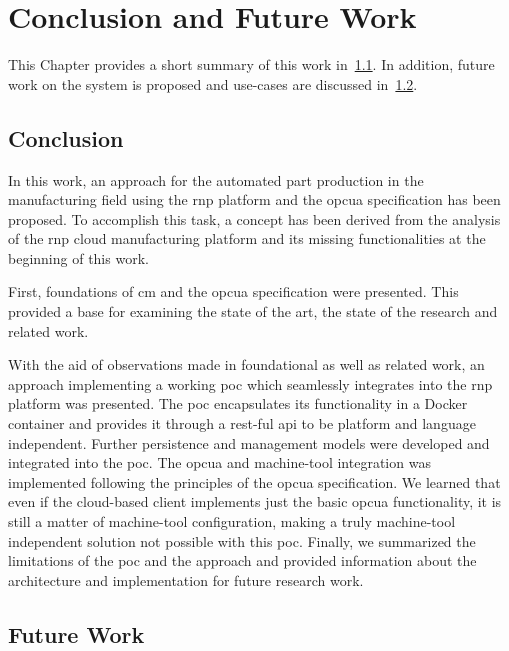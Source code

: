 \documentclass[
a4paper,
twoside,
headsepline,
cleardoublepage=empty,
parskip=half,
draft=false
]{scrbook}
\begin{document}
	\chapter{Conclusion and Future Work} \label{ch:conclusion_and_future_work}

		This Chapter provides a short summary of this work in~\cref{sec:conclusion}. In addition, future work on the system is proposed and use-cases are discussed in~\cref{sec:future_work}.

		\section{Conclusion}\label{sec:conclusion}

			In this work, an approach for the automated part production in the manufacturing field using the \gls{rnp} platform and the \gls{opcua} specification has been proposed. To accomplish this task, a concept has been derived from the analysis of the \gls{rnp} cloud manufacturing platform and its missing functionalities at the beginning of this work.

			First, foundations of \gls{cm} and the \gls{opcua} specification were presented. This provided a base for examining the state of the art, the state of the research and related work.

			With the aid of observations made in foundational as well as related work, an approach implementing a working \gls{poc} which seamlessly integrates into the \gls{rnp} platform was presented. The \gls{poc} encapsulates its functionality in a Docker container and provides it through a \gls{rest}-ful \gls{api} to be platform and language independent. Further persistence and management models were developed and integrated into the \gls{poc}. The \gls{opcua} and machine-tool integration was implemented following the principles of the \gls{opcua} specification. We learned that even if the cloud-based client implements just the basic \gls{opcua} functionality, it is still a matter of machine-tool configuration, making a truly machine-tool independent solution not possible with this \gls{poc}. Finally, we summarized the limitations of the \gls{poc} and the approach and provided information about the architecture and implementation for future research work.

		\section{Future Work}\label{sec:future_work}
\end{document}
